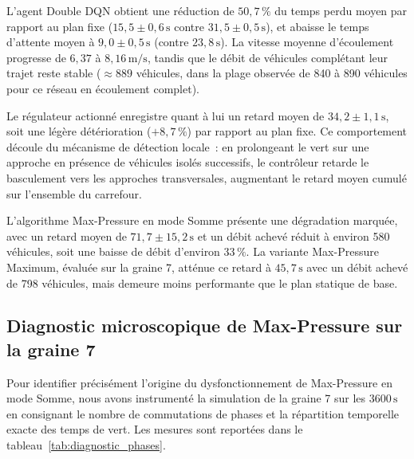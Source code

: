 \documentclass[10pt,twocolumn,letterpaper]{article}
\begin{document}
L'agent Double DQN obtient une réduction de $50{,}7\,\%$ du temps perdu moyen par rapport au plan fixe ($15{,}5 \pm 0{,}6\,\mathrm{s}$ contre $31{,}5 \pm 0{,}5\,\mathrm{s}$), et abaisse le temps d'attente moyen à $9{,}0 \pm 0{,}5\,\mathrm{s}$ (contre $23{,}8\,\mathrm{s}$). La vitesse moyenne d'écoulement progresse de $6{,}37$ à $8{,}16\,\mathrm{m/s}$, tandis que le débit de véhicules complétant leur trajet reste stable ($\approx 889$ véhicules, dans la plage observée de 840 à 890 véhicules pour ce réseau en écoulement complet).

Le régulateur actionné enregistre quant à lui un retard moyen de $34{,}2 \pm 1{,}1\,\mathrm{s}$, soit une légère détérioration ($+8{,}7\,\%$) par rapport au plan fixe. Ce comportement découle du mécanisme de détection locale~: en prolongeant le vert sur une approche en présence de véhicules isolés successifs, le contrôleur retarde le basculement vers les approches transversales, augmentant le retard moyen cumulé sur l'ensemble du carrefour.

L'algorithme Max-Pressure en mode Somme présente une dégradation marquée, avec un retard moyen de $71{,}7 \pm 15{,}2\,\mathrm{s}$ et un débit achevé réduit à environ 580 véhicules, soit une baisse de débit d'environ $33\,\%$. La variante Max-Pressure Maximum, évaluée sur la graine 7, atténue ce retard à $45{,}7\,\mathrm{s}$ avec un débit achevé de 798 véhicules, mais demeure moins performante que le plan statique de base.

\subsection{Diagnostic microscopique de Max-Pressure sur la graine 7}
\label{subsec:diagnostic}

Pour identifier précisément l'origine du dysfonctionnement de Max-Pressure en mode Somme, nous avons instrumenté la simulation de la graine 7 sur les $3600\,\mathrm{s}$ en consignant le nombre de commutations de phases et la répartition temporelle exacte des temps de vert. Les mesures sont reportées dans le tableau~\ref{tab:diagnostic_phases}.

\begin{table}[t]
\centering
\caption{Diagnostic microscopique d'allocation des phases sur la graine 7 ($3600\,\mathrm{s}$)}
\label{tab:diagnostic_phases}
\vspace{0.15cm}
\end{table}
\end{document}
